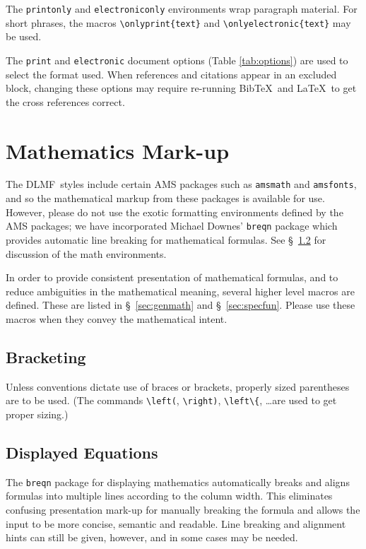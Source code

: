 \documentclass[twoside]{article}
\newcommand{\DLMF}{{\sc DLMF}}
\newcommand{\package}[1]{\texttt{#1}}
\newcommand{\token}[1]{\texttt{#1}}
\newcommand{\BibTeX}{Bib\TeX}
\begin{document}
The \token{printonly} and \token{electroniconly} environments wrap paragraph material.
For short phrases, the macros \verb|\onlyprint{text}| and 
\verb|\onlyelectronic{text}| may be used.

The \token{print} and \token{electronic} document options (Table \ref{tab:options})
are used to select the format used.
When references and citations appear in an excluded block,
changing these options may require re-running \BibTeX\ and \LaTeX\ to
get the cross references correct.

\section{Mathematics Mark-up}\label{sec:math}
The \DLMF\ styles include certain AMS packages such as \package{amsmath} and
\package{amsfonts}, and so the mathematical markup
from these packages is available for use.
However, please do not use the exotic formatting environments
defined by the AMS packages; we have incorporated Michael Downes' \package{breqn} 
package which provides automatic line breaking for mathematical formulas.  
See \S~\ref{sec:dispmath} for discussion of the math environments.

In order to provide consistent presentation of mathematical formulas, and 
to reduce ambiguities in the mathematical meaning, several higher level
macros are defined.  These are listed in \S~\ref{sec:genmath} 
and \S~\ref{sec:specfun}.
Please use these macros when they convey the mathematical intent.

\subsection{Bracketing}
Unless conventions dictate use of braces or brackets,
properly sized parentheses are to be used. (The commands 
\verb|\left(|, \verb|\right)|, \verb|\left\{|, \ldots are used to get proper sizing.)

\subsection{Displayed Equations}\label{sec:dispmath}
The \package{breqn} package for displaying mathematics automatically breaks
and aligns formulas into multiple lines according to the column width.  
This eliminates confusing presentation mark-up for manually breaking the formula
and allows the input to be more concise, semantic and readable.  
Line breaking and alignment hints can still be given, however, 
and in some cases may be needed.
\end{document}
